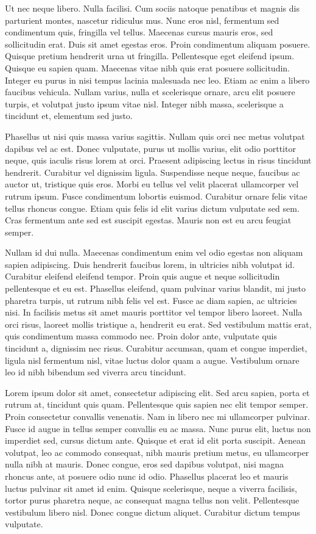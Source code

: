 \documentclass[13pt, letterpaper, twoside]{book}
\begin{document}
Ut nec neque libero. Nulla facilisi. Cum sociis natoque penatibus et magnis dis parturient montes, nascetur ridiculus mus. Nunc eros nisl, fermentum sed condimentum quis, fringilla vel tellus. Maecenas cursus mauris eros, sed sollicitudin erat. Duis sit amet egestas eros. Proin condimentum aliquam posuere. Quisque pretium hendrerit urna ut fringilla. Pellentesque eget eleifend ipsum. Quisque eu sapien quam. Maecenas vitae nibh quis erat posuere sollicitudin. Integer eu purus in nisi tempus lacinia malesuada nec leo. Etiam ac enim a libero faucibus vehicula. Nullam varius, nulla et scelerisque ornare, arcu elit posuere turpis, et volutpat justo ipsum vitae nisl. Integer nibh massa, scelerisque a tincidunt et, elementum sed justo.

Phasellus ut nisi quis massa varius sagittis. Nullam quis orci nec metus volutpat dapibus vel ac est. Donec vulputate, purus ut mollis varius, elit odio porttitor neque, quis iaculis risus lorem at orci. Praesent adipiscing lectus in risus tincidunt hendrerit. Curabitur vel dignissim ligula. Suspendisse neque neque, faucibus ac auctor ut, tristique quis eros. Morbi eu tellus vel velit placerat ullamcorper vel rutrum ipsum. Fusce condimentum lobortis euismod. Curabitur ornare felis vitae tellus rhoncus congue. Etiam quis felis id elit varius dictum vulputate sed sem. Cras fermentum ante sed est suscipit egestas. Mauris non est eu arcu feugiat semper.



Nullam id dui nulla. Maecenas condimentum enim vel odio egestas non aliquam sapien adipiscing. Duis hendrerit faucibus lorem, in ultricies nibh volutpat id. Curabitur eleifend eleifend tempor. Proin quis augue et neque sollicitudin pellentesque et eu est. Phasellus eleifend, quam pulvinar varius blandit, mi justo pharetra turpis, ut rutrum nibh felis vel est. Fusce ac diam sapien, ac ultricies nisi. In facilisis metus sit amet mauris porttitor vel tempor libero laoreet. Nulla orci risus, laoreet mollis tristique a, hendrerit eu erat. Sed vestibulum mattis erat, quis condimentum massa commodo nec. Proin dolor ante, vulputate quis tincidunt a, dignissim nec risus. Curabitur accumsan, quam et congue imperdiet, ligula nisl fermentum nisl, vitae luctus dolor quam a augue. Vestibulum ornare leo id nibh bibendum sed viverra arcu tincidunt. 



Lorem ipsum dolor sit amet, consectetur adipiscing elit. Sed arcu sapien, porta et rutrum at, tincidunt quis quam. Pellentesque quis sapien nec elit tempor semper. Proin consectetur convallis venenatis. Nam in libero nec mi ullamcorper pulvinar. Fusce id augue in tellus semper convallis eu ac massa. Nunc purus elit, luctus non imperdiet sed, cursus dictum ante. Quisque et erat id elit porta suscipit. Aenean volutpat, leo ac commodo consequat, nibh mauris pretium metus, eu ullamcorper nulla nibh at mauris. Donec congue, eros sed dapibus volutpat, nisi magna rhoncus ante, at posuere odio nunc id odio. Phasellus placerat leo et mauris luctus pulvinar sit amet id enim. Quisque scelerisque, neque a viverra facilisis, tortor purus pharetra neque, ac consequat magna tellus non velit. Pellentesque vestibulum libero nisl. Donec congue dictum aliquet. Curabitur dictum tempus vulputate.
\end{document}

